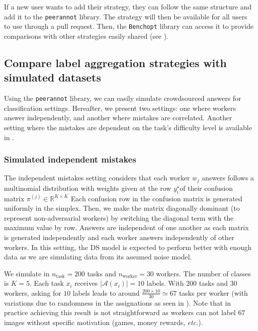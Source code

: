 If a new user wants to add their strategy, they can follow the same structure and add it to the \texttt{peerannot} library. The strategy will then be available for all users to use through a pull request.
Then, the \texttt{Benchopt} library can access it to provide comparisons with other strategies easily shared (see ).

\subsection{Compare label aggregation strategies with simulated datasets}
\label{subsec:simulated}

Using the \texttt{peerannot} library, we can easily simulate crowdsourced answers for classification settings.
Hereafter, we present two settings: one where workers answer independently, and another where mistakes are correlated.
Another setting where the mistakes are dependent on the task's difficulty level is available in .

\subsubsection{Simulated independent mistakes}

The independent mistakes setting considers that each worker $w_j$ answers follows a multinomial distribution with weights given at the row $y_i^\star$​ of their confusion matrix $\pi^{(j)}\in\mathbb{R}^{K\times K}$ Each confusion row in the confusion matrix is generated uniformly in the simplex. Then, we make the matrix diagonally dominant (to represent non-adversarial workers) by switching the diagonal term with the maximum value by row. Answers are independent of one another as each matrix is generated independently and each worker answers independently of other workers. In this setting, the DS model is expected to perform better with enough data as we are simulating data from its assumed noise model.

We simulate in  $n_{\text{task}}=200$ tasks and $n_{\text{worker}}=30$ workers. The number of classes is $K=5$.
Each task $x_i$ receives $|\mathcal{A}(x_i)|=10$ labels. With $200$ tasks and $30$ workers, asking for $10$ labels leads to around $\frac{200\times 10}{30}\simeq 67$ tasks per worker (with variations due to randomness in the assignations as seen in ). Note that in practice achieving this result is not straightforward as workers can not label $67$ images without specific motivation (games, money rewards, \textit{etc.}).

